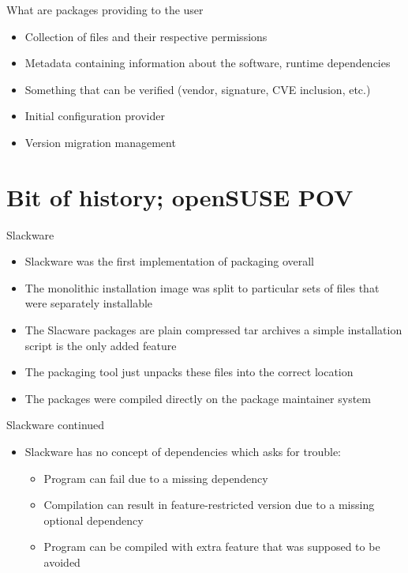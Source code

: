 \documentclass{beamer}
\begin{document}
\begin{frame}[t]{What are packages providing to the user}
	\begin{itemize}
	\item Collection of files and their respective permissions
	\item Metadata containing information about the software, runtime dependencies
	\item Something that can be verified (vendor, signature, CVE inclusion, etc.)
	\item Initial configuration provider
	\item Version migration management
	\end{itemize}
\end{frame}

\section{Bit of history; openSUSE POV}

\begin{frame}[t]{Slackware}
	\begin{itemize}
	\item Slackware was the first implementation of packaging overall
	\item The monolithic installation image was split to particular sets of files that were separately installable
	\item The Slacware packages are plain compressed tar archives a simple installation script is the only added feature
	\item The packaging tool just unpacks these files into the correct location
	\item The packages were compiled directly on the package maintainer system
	\end{itemize}
\end{frame}

\begin{frame}[t]{Slackware continued}
	\begin{itemize}
    \item Slackware has no concept of dependencies which asks for trouble:
    \begin{itemize}
    \item Program can fail due to a missing dependency
    \item Compilation can result in feature-restricted version due to a missing optional dependency
    \item Program can be compiled with extra feature that was supposed to be avoided
    \end{itemize}
	\end{itemize}
\end{frame}
\end{document}
